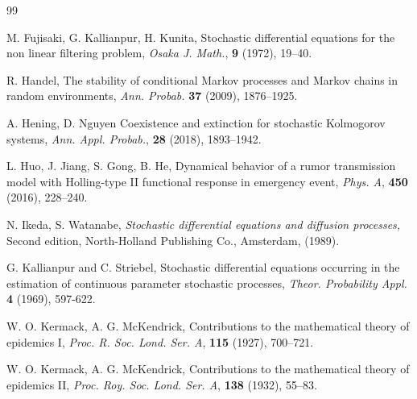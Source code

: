 \documentclass[12pt]{amsart}
\theoremstyle{remark}
\numberwithin{equation}{section}
\numberwithin{equation}{section}
\newcommand{\1}{\boldsymbol{1}}
\begin{document}
\begin{thebibliography}{99}
{%

 M. Fujisaki,
G. Kallianpur,
H. Kunita,
Stochastic differential equations for the non linear filtering problem, {\it Osaka J. Math.}, {\bf 9} (1972), %
19--40.


 R. Handel, The stability of conditional Markov processes and Markov chains in random environments, {\it Ann. Probab.} {\bf 37} (2009), 1876--1925.

 A. Hening, D. Nguyen Coexistence and extinction for stochastic Kolmogorov systems,
{\it Ann. Appl. Probab.}, {\bf 28} (2018), 1893--1942.

 L. Huo, J. Jiang, S. Gong, B. He, Dynamical behavior of a rumor transmission model with Holling-type II functional response in emergency event, {\it Phys. A}, {\bf 450} (2016), 228--240.

 N. Ikeda, S. Watanabe, {\it Stochastic differential equations and diffusion processes,} Second edition, North-Holland Publishing Co., Amsterdam, (1989).





 G. Kallianpur and C. Striebel, Stochastic differential equations occurring in the
estimation of continuous parameter stochastic processes, {\it Theor. Probability Appl.} {\bf 4}
(1969), 597-622.



 W. O. Kermack, A. G. McKendrick, Contributions to the mathematical theory of epidemics I, {\it
Proc. R. Soc. Lond. Ser. A}, {\bf 115} (1927), 700--721.

 W. O. Kermack, A. G. McKendrick, Contributions to the mathematical theory of epidemics II,
{\it Proc. Roy. Soc. Lond. Ser. A}, {\bf 138} (1932), 55--83.

}
\end{thebibliography}
\end{document}
